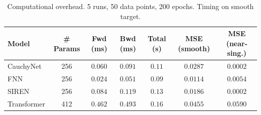 \begin{table}[ht]\centering
\caption{Computational overhead. 5 runs, 50 data points, 200 epochs. Timing on smooth target.}
\label{tab:overhead}
\begin{tabular}{lcccccc}
\toprule
Model & \# Params & Fwd (ms) & Bwd (ms) & Total (s) & MSE (smooth) & MSE (near-sing.) \\
\midrule
CauchyNet & 256 & $0.060$ & $0.091$ & $0.11$ & $0.0287$ & $0.0002$ \\
FNN & 256 & $0.024$ & $0.051$ & $0.09$ & $0.0114$ & $0.0054$ \\
SIREN & 256 & $0.084$ & $0.119$ & $0.13$ & $0.0186$ & $0.0002$ \\
Transformer & 412 & $0.462$ & $0.493$ & $0.16$ & $0.0455$ & $0.0590$ \\
\bottomrule
\end{tabular}
\end{table}